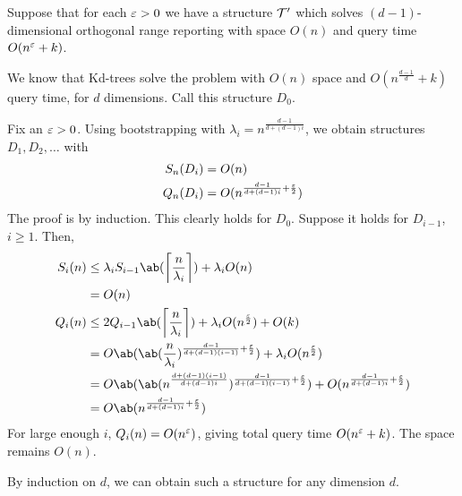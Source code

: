 \begin{solution}
    Suppose that for each $\varepsilon > 0$
    we have a structure $\mathcal{T}'$ which solves $(d-1)$-dimensional
    orthogonal range reporting with space $O(n)$ and query time
    $O(n^{\varepsilon} + k)$.

    We know that Kd-trees solve the problem with $O(n)$ space and
    $O(n^{\frac{d-1}{d}} + k)$ query time, for $d$ dimensions.
    Call this structure $D_0$.

    Fix an $\varepsilon > 0$.
    Using bootstrapping with $\lambda_i = n^{\frac{d-1}{d + (d-1)i}}$,
    we obtain structures $D_1, D_2, \dots$ with \begin{align*}
        S_n(D_i) &= O(n) \\
        Q_n(D_i) &= O(n^{\frac{d-1}{d + (d-1)i} + \frac {\varepsilon} 2})
    \end{align*}
    The proof is by induction.
    This clearly holds for $D_0$.
    Suppose it holds for $D_{i-1}$, $i \ge 1$.
    Then, \begin{align*}
        S_i(n) &\le \lambda_i S_{i-1}\ab(\ceil*{\frac n{\lambda_i}})
            + \lambda_i O(n) \\
        &= O(n) \\
        Q_i(n) &\le 2 Q_{i-1}\ab(\ceil*{\frac n{\lambda_i}})
            + \lambda_i O(n^{\frac \eps 2}) + O(k) \\
        &= O\ab(\ab(\frac n{\lambda_i})^{\frac{d-1}{d + (d-1)(i-1)} + \frac \eps 2})
            + \lambda_i O(n^{\frac \eps 2}) \\
        &= O\ab(\ab(n^{\frac{d + (d-1)(i-1)}{d + (d-1)i}})
                ^{\frac{d-1}{d + (d-1)(i-1)} + \frac \eps 2})
            + O(n^{\frac{d-1}{d + (d-1)i} + \frac \eps 2}) \\
        &= O\ab(n^{\frac{d-1}{d + (d-1)i} + \frac \eps 2})
    \end{align*}
    For large enough $i$, $Q_i(n) = O(n^{\varepsilon})$, giving total query time
    $O(n^{\varepsilon} + k)$.
    The space remains $O(n)$.

    By induction on $d$, we can obtain such a structure for any
    dimension $d$.
\end{solution}
